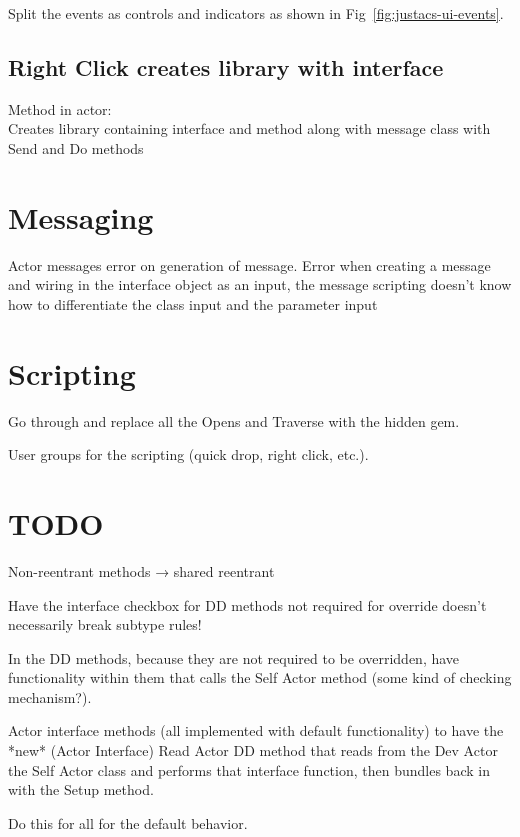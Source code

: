 \documentclass{article}
\begin{document}
Split the events as controls and indicators as shown in Fig~\ref{fig:justacs-ui-events}.

\subsection{Right Click creates library with interface}

Method in actor: \\
Creates library containing interface and method along with message class with Send and Do methods

\section{Messaging}
\label{sec:messaging}

Actor messages error on generation of message.
Error when creating a message and wiring in the interface object as an input, the message scripting doesn't know how to differentiate the class input and the parameter input


\section{Scripting}
\label{sec:scripting}

Go through and replace all the Opens and Traverse with the hidden gem.

User groups for the scripting (quick drop, right click, etc.).


\section{TODO}
\label{sec:todo}

Non-reentrant methods → shared reentrant

Have the interface checkbox for DD methods not required for override doesn't necessarily break subtype rules!

In the DD methods, because they are not required to be overridden, have functionality within them that calls the Self Actor method (some kind of checking mechanism?).

Actor interface methods (all implemented with default functionality) to have the *new* (Actor Interface) Read Actor DD method that reads from the Dev Actor the Self Actor class and performs that interface function, then bundles back in with the Setup method.

Do this for all for the default behavior.
\end{document}
